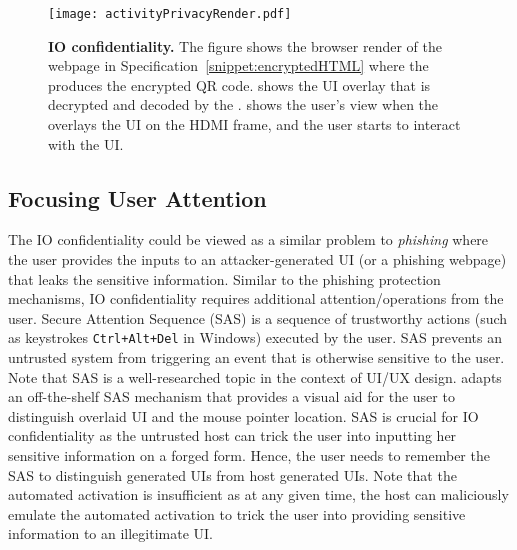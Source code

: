 \begin{figure}[t]
\centering
\texttt{[image: activityPrivacyRender.pdf]}
\caption{\textbf{\name IO confidentiality.} The figure shows \one the browser render of the webpage in Specification~\ref{snippet:encryptedHTML} where the \name \js produces the encrypted QR code. \two shows the UI overlay that is decrypted and decoded by the \device. \three shows the user's view when the \device overlays the UI on the HDMI frame, and the user starts to interact with the UI.}
\spacesave
\label{fig:activityPrivacy}
\centering
\end{figure}

\subsection{Focusing User Attention} 
\label{sec:confidentiality:SAS}

The IO confidentiality could be viewed as a similar problem to \emph{phishing} where the user provides the inputs to an attacker-generated UI (or a phishing webpage) that leaks the sensitive information. Similar to the phishing protection mechanisms, IO confidentiality requires additional attention/operations from the user. Secure Attention Sequence (SAS) is a sequence of trustworthy actions (such as keystrokes \texttt{Ctrl+Alt+Del} in Windows) executed by the user. SAS prevents an untrusted system from triggering an event that is otherwise sensitive to the user. Note that SAS is a well-researched topic in the context of UI/UX design. \name adapts an off-the-shelf SAS mechanism that provides a visual aid for the user to distinguish overlaid UI and the mouse pointer location. SAS is crucial for IO confidentiality as the untrusted host can trick the user into inputting her sensitive information on a forged form. Hence, the user needs to remember the SAS to distinguish \device generated UIs from host generated UIs. Note that the automated activation is insufficient as at any given time, the host can maliciously emulate the automated activation to trick the user into providing sensitive information to an illegitimate UI.

